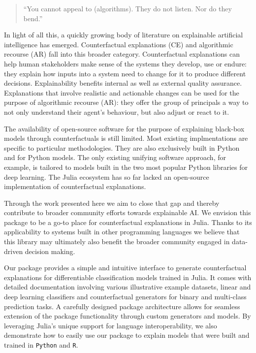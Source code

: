 \documentclass{juliacon}
\begin{document}
\begin{quote}
``You cannot appeal to (algorithms). They do not listen. Nor do they
bend.'' \cite{o2016weapons}
\end{quote}

In light of all this, a quickly growing body of literature on
explainable artificial intelligence has emerged. Counterfactual
explanations (CE) and algorithmic recourse (AR) fall into this broader
category. Counterfactual explanations can help human stakeholders make
sense of the systems they develop, use or endure: they explain how
inputs into a system need to change for it to produce different
decisions. Explainability benefits internal as well as external quality
assurance. Explanations that involve realistic and actionable changes
can be used for the purpose of algorithmic recourse (AR): they offer the
group of principals a way to not only understand their agent's
behaviour, but also adjust or react to it.

The availability of open-source software for the purpose of explaining
black-box models through counterfactuals is still limited. Most existing
implmentations are specific to particular methodologies. They are also
exclusively built in Python and for Python models. The only existing
unifying software approach, for example, is tailored to models built in
the two most popular Python libraries for deep learning. The Julia
ecosystem has so far lacked an open-source implementation of
counterfactual explanations.

Through the work presented here we aim to close that gap and thereby
contribute to broader community efforts towards explainable AI. We
envision this package to be a go-to place for counterfactual
explanations in Julia. Thanks to its applicability to systems built in
other programming languages we believe that this library may ultimately
also benefit the broader community engaged in data-driven decision
making.

Our package provides a simple and intuitive interface to generate
counterfactual explanations for differentiable classification models
trained in Julia. It comes with detailed documentation involving various
illustrative example datasets, linear and deep learning classifiers and
counterfactual generators for binary and multi-class prediction tasks. A
carefully designed package architecture allows for seamless extension of
the package functionality through custom generators and models. By
leveraging Julia's unique support for language interoperability, we also
demonstrate how to easily use our package to explain models that were
built and trained in \texttt{Python} and \texttt{R}.
\end{document}
